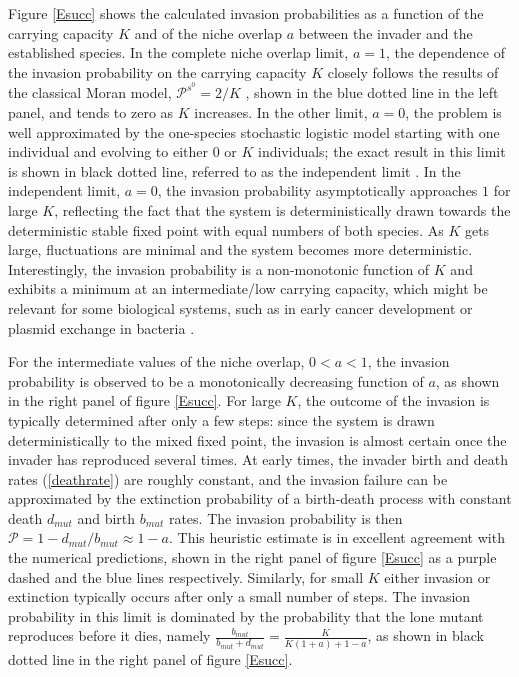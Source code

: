 Figure \ref{Esucc} shows the calculated invasion probabilities as a function of the carrying capacity $K$ and of the niche overlap $a$ between the invader and the established species. 
In the complete niche overlap limit, $a=1$, the dependence of the invasion probability on the carrying capacity $K$ closely follows the results of the classical Moran model, $\mathcal{P}^{s^0}=2/K$ \cite{Moran1962}, shown in the blue dotted line in the left panel, and tends to zero as $K$ increases. 
In the other limit, $a=0$, the problem is well approximated by the one-species stochastic logistic model starting with one individual and evolving to either $0$ or $K$ individuals; the exact result in this limit is shown in black dotted line, referred to as the independent limit \cite{Nisbet1982}. 
In the independent limit, $a=0$, the invasion probability asymptotically approaches $1$ for large $K$, reflecting the fact that the system is deterministically drawn towards the deterministic stable fixed point with equal numbers of both species. 
As $K$ gets large, fluctuations are minimal and the system becomes more deterministic. 
Interestingly, the invasion probability is a non-monotonic function of $K$ and exhibits a minimum at an intermediate/low carrying capacity, which might be relevant for some biological systems, such as in early cancer development \cite{Ashcroft2015} or plasmid exchange in bacteria \cite{Gooding-townsend2015}.

For the intermediate values of the niche overlap, $0<a<1$, the invasion probability is observed to be a monotonically decreasing function of $a$, as shown in the right panel of figure \ref{Esucc}. 
For large $K$, the outcome of the invasion is typically determined after only a few steps: since the system is drawn deterministically to the mixed fixed point, the invasion is almost certain once the invader has reproduced several times. 
At early times, the invader birth and death rates (\ref{deathrate}) are roughly constant, and the invasion failure can be approximated by the extinction probability of a birth-death process with constant death $d_{mut}$ and birth $b_{mut}$ rates. 
The invasion probability is then $\mathcal{P}=1- d_{mut}/b_{mut}\approx 1-a$. 
This heuristic estimate is in excellent agreement with the numerical predictions, shown in the right panel of figure \ref{Esucc} as a purple dashed and the blue lines respectively.
Similarly, for small $K$ either invasion or extinction typically occurs after only a small number of steps. 
The invasion probability in this limit is dominated by the probability that the lone mutant reproduces before it dies, namely $\frac{b_{mut}}{b_{mut}+d_{mut}} = \frac{K}{K(1+a)+1-a}$, as shown in black dotted line in the right panel of figure \ref{Esucc}.


